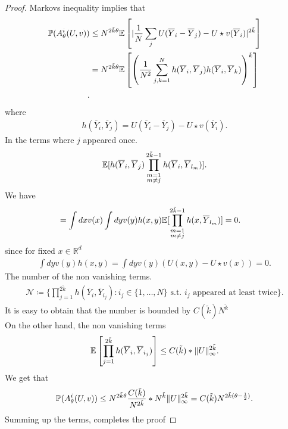 \begin{proof}
 Markovs inequality   implies that 
 \begin{align*}
   \P(A_{\theta }^{i}(U,v) )&\le  N^{2 \tilde{k} \theta }  \E\left[\abs{\frac{1}{N} \sum_{j} U(\overline{Y}_i - \overline{Y}_j) - U \star  v (\overline{Y}_i ) }^{2 \tilde{k} } \right]\\
                            &=  N^{2 \tilde{k} \theta }  \E\left[\left(\frac{1}{N^2} \sum_{j,k=1}^{N}  h(\overline{Y}_i,\overline{Y}_j  )h(\overline{Y}_i,\overline{Y}_k  ) \right)^{\tilde{k} } \right]\\
 .\end{align*}
 where 
 \begin{align*}
  h(\overline{Y}_i,\overline{Y}_j) =    U(\overline{Y}_i - \overline{Y}_j) - U \star  v (\overline{Y}_i)
 .\end{align*}
 In the terms where $j$ appeared once. 
 \begin{align*}
   \E[h(\overline{Y}_i,\overline{Y}_j  ) \prod_{\substack{m=1\\ m\neq j}}^{2 \tilde{k}-1 } h(\overline{Y}_i , \overline{Y}_{l_m}  )] 
 .\end{align*}
 We have 
 \begin{align*}
    = \int dx v(x) \int  dy v(y)h(x,y) \E[\prod_{\substack{m=1\\ m\neq j}}^{2 \tilde{k}-1 } h(x, \overline{Y}_{l_m} )] &= 0 
 .\end{align*}
 since  for fixed $x \in  \mathbb{R}^{d} $
 \begin{align*}
   \int dy v(y)h(x,y) =  \int dy v(y) (U(x,y) - U \star  v(x)) = 0
 .\end{align*}
 The number of the non vanishing terms.
 \begin{align*}
   \mathcal{N} \coloneqq  \{\prod_{j=1}^{2 \tilde{k} }h(\overline{Y}_i,\overline{Y}_{i_j}) : i_j \in  \{1 , \ldots , N\} \text{ s.t. } i_j \text{ appeared at least twice}   \}  
 .\end{align*}
 It is easy to obtain that the number is bounded by $C(\tilde{k} )N^{\tilde{k} } $\\[1ex]
 On the other hand, the non vanishing terms 
 \begin{align*}
   \E\left[\prod_{j=1}^{2 \tilde{k} }h(\overline{Y}_i,\overline{Y}_{i_j})\right] \le  C(\tilde{k} )* \|U\|_{\infty}^{2 \tilde{k} } 
 .\end{align*}
 We get that 
 \begin{align*}
   \P(A_{\theta }^{i}(U,v) ) \le N^{2 \tilde{k}\theta  } \frac{C(\tilde{k} )}{N^{2 \tilde{k} } } * N^{\tilde{k} } \|U\|_{\infty}^{2 \tilde{k} }  = C(\tilde{k}) N^{2 \tilde{k}(\theta  - \frac{1}{2}) } 
 .\end{align*}
 Summing up the terms, completes the proof
\end{proof}
